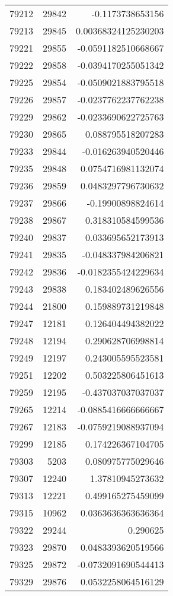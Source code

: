 \begin{tabular}{r | r | r}
79212 & 29842 & -0.1173738653156 \\
79213 & 29845 & 0.00368324125230203 \\
79221 & 29855 & -0.0591182510668667 \\
79222 & 29858 & -0.0394170255051342 \\
79225 & 29854 & -0.0509021883795518 \\
79226 & 29857 & -0.0237762237762238 \\
79229 & 29862 & -0.0233690622725763 \\
79230 & 29865 & 0.088795518207283 \\
79233 & 29844 & -0.016263940520446 \\
79235 & 29848 & 0.0754716981132074 \\
79236 & 29859 & 0.0483297796730632 \\
79237 & 29866 & -0.19900898824614 \\
79238 & 29867 & 0.318310584599536 \\
79240 & 29837 & 0.033695652173913 \\
79241 & 29835 & -0.048337984206821 \\
79242 & 29836 & -0.0182355424229634 \\
79243 & 29838 & 0.183402489626556 \\
79244 & 21800 & 0.159889731219848 \\
79247 & 12181 & 0.126404494382022 \\
79248 & 12194 & 0.290628706998814 \\
79249 & 12197 & 0.243005595523581 \\
79251 & 12202 & 0.503225806451613 \\
79259 & 12195 & -0.437037037037037 \\
79265 & 12214 & -0.0885416666666667 \\
79267 & 12183 & -0.0759219088937094 \\
79299 & 12185 & 0.174226367104705 \\
79303 & 5203 & 0.080975775029646 \\
79307 & 12240 & 1.37810945273632 \\
79313 & 12221 & 0.499165275459099 \\
79315 & 10962 & 0.0363636363636364 \\
79322 & 29244 & 0.290625 \\
79323 & 29870 & 0.0483393620519566 \\
79325 & 29872 & -0.0732091690544413 \\
79329 & 29876 & 0.0532258064516129 \\

\end{tabular}
